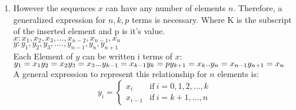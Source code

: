 \documentclass[letterpaper, 24pt, final, onecolumn, titlepage] {article}
\begin{document}
\begin {enumerate}
\begin{enumerate}
				 A general expression to represent this relationship for 10 elements is:\\
				\[
					y_i=
					\begin{cases}
  						x_i & \text{if}\ i=0,1,2,3,4,5 \\
 					 	x_{i-1}           & \text{if}\ i=6,7,8,9,10,11
					\end{cases}
				\]
			\item However the sequences $x$ can have any number of elements $n$. Therefore, a generalized expression for $n,k,p$ terms is necessary. Where K is the subscript of the inserted element and p is it's value.\\
				$x:x_1,x_2,x_3,...,x_{n-2},x_{n-1},x_n$\\
				$y:y_1,y_2,y_3,....,y_{n-1},y_{n},y_{n+1}$\\
				Each Element of $y$ can  be written i terms of $x$:\\
			       $y_1=x_1\\
				 y_2=x_2\\
				 y_3=x_3\\
				...\\
				y_{k-1}=x_{k-1}\\
				y_k=p\\
				y_{k+1}=x_k\\
				..\\
			 	 y_{n}=x_{n-1}\\
				 y_{n+1}=x_n$\\
 				 A general expression to represent this relationship for $n$ elements is:\\
				\[
					y_i=
					\begin{cases}
  						x_i & \text{if}\ i=0,1,2,...,k \\
 					 	x_{i-1}           & \text{if}\ i=k+1,...,n
					\end{cases}
				\]
		\end{enumerate}
\end{enumerate}
\end{document}

